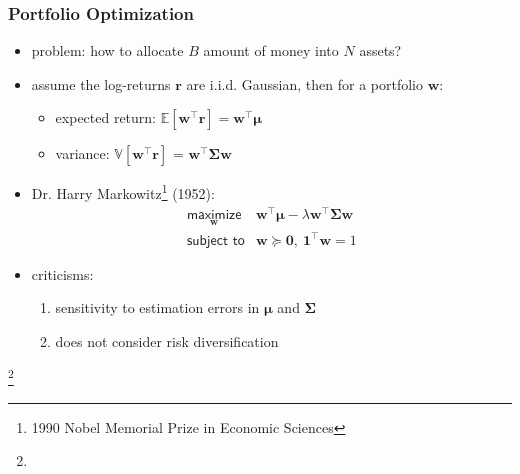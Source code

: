 \documentclass{beamer}
\newcommand\blfootnote[1]{%
  \begingroup
  \renewcommand\thefootnote{}\footnote{#1}%
  \addtocounter{footnote}{-1}%
  \endgroup
}
\begin{document}
		\begin{frame}
			\frametitle{Portfolio Optimization}
                        \vspace{1cm}
                        \begin{itemize}
                          \item problem: how to allocate $B$ amount of money into $N$ assets?
                            \pause
                          \item assume the log-returns $\bm{r}$ are i.i.d. Gaussian, then for a portfolio $\bm{w}$:
                            \begin{itemize}
                              \item expected return: $\mathbb{E}\left[\bm{w}^\top \bm{r}\right] = \bm{w}^\top\boldsymbol{\mu}$
                              \item variance: $\mathbb{V}\left[\bm{w}^\top \bm{r}\right]$ = $\bm{w}^\top\boldsymbol{\Sigma}\bm{w}$
                            \end{itemize}
                            \pause
                          \item Dr. Harry Markowitz\footnote{1990 Nobel Memorial Prize in Economic Sciences} (1952):
                                  \begin{equation*}
                                  \begin{array}{ll}
                                    \underset{\bm{w}}{\textsf{maximize}} & \bm{w}^\top\boldsymbol{\mu} - \lambda\bm{w}^\top\boldsymbol{\Sigma}\bm{w}\\
                                    \textsf{subject to} & \bm{w}\succeq \mathbf{0}, ~\mathbf{1}^\top\bm{w} = 1
                                  \end{array}
                                  \end{equation*}
                            \pause
                           \item criticisms:
                             \begin{enumerate}
                               \item sensitivity to estimation errors in $\boldsymbol{\mu}$ and $\boldsymbol{\Sigma}$
                               \item does not consider risk diversification
                               \end{enumerate}
                        \end{itemize}
                        \blfootnote{  }
		\end{frame}
\end{document}
